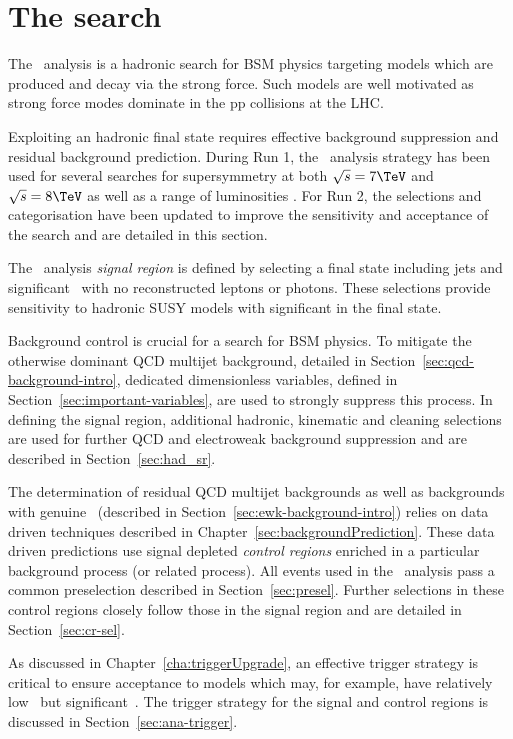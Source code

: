 \chapter{The \alphat search}
\label{cha:alphat}

The \alphat~analysis is a hadronic search for BSM physics 
targeting models which are produced and decay via the strong force.
Such models are well motivated as strong force modes dominate 
in the pp collisions at the LHC. 

Exploiting an hadronic final state requires effective 
background suppression and residual background prediction. During Run 1, 
the \alphat~analysis strategy has been used for several searches for supersymmetry at
both $\sqrt{s} = 7 \TeV$ and $\sqrt{s} = 8 \TeV$ as well as a range of luminosities
\cite{alphaT1,alphaT2,alphaT3,alphaT4}. For Run 2, the selections and categorisation 
have been updated to improve the sensitivity and acceptance of the search and are detailed
in this section.

The \alphat~analysis \emph{signal region} is defined by selecting a final state 
including jets and significant \met~with no reconstructed leptons or photons. 
These selections provide sensitivity to hadronic SUSY models with significant \met
in the final state.

Background control is crucial for a search for BSM physics. To mitigate the otherwise 
dominant QCD multijet background, detailed in Section~\ref{sec:qcd-background-intro}, dedicated dimensionless variables, 
defined in Section~\ref{sec:important-variables}, are used to strongly suppress this process.
In defining the signal region, additional hadronic, kinematic and cleaning selections 
are used for further QCD and electroweak background suppression and are described in 
Section~\ref{sec:had_sr}.

The determination of residual QCD multijet backgrounds as well as backgrounds with 
genuine \met~(described in Section~\ref{sec:ewk-background-intro}) relies on data driven techniques 
described in Chapter~\ref{sec:backgroundPrediction}. These data driven predictions use signal 
depleted \emph{control regions} enriched in a particular background process 
(or related process). All events used in the \alphat~analysis pass
a common preselection described in Section~\ref{sec:presel}. Further selections in
these control regions closely follow those in the signal region and are detailed in 
Section~\ref{sec:cr-sel}.

As discussed in Chapter~\ref{cha:triggerUpgrade}, an effective trigger strategy is 
critical to ensure acceptance to models which may, for example, have relatively low
\scalht~but significant~\mht. The trigger strategy for the signal and control regions
is discussed in Section~\ref{sec:ana-trigger}.

